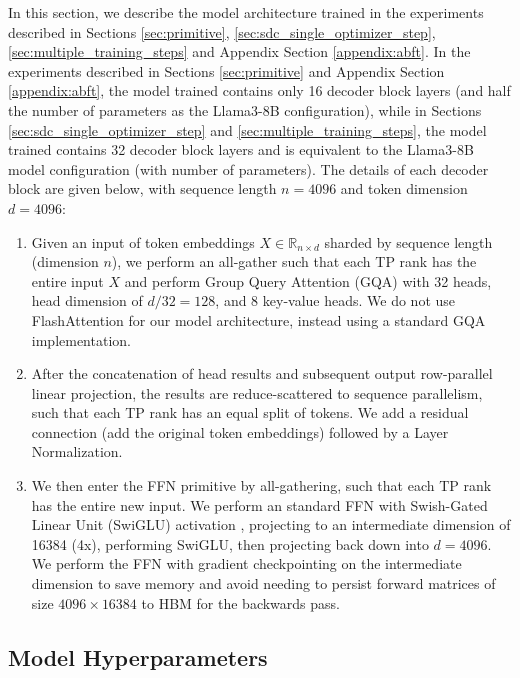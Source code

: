 In this section, we describe the model architecture trained in the experiments described in Sections \ref{sec:primitive}, \ref{sec:sdc_single_optimizer_step}, \ref{sec:multiple_training_steps} and Appendix Section \ref{appendix:abft}. In the experiments described in Sections \ref{sec:primitive} and Appendix Section \ref{appendix:abft}, the model trained contains only 16 decoder block layers (and half the number of parameters as the Llama3-8B configuration), while in Sections \ref{sec:sdc_single_optimizer_step} and \ref{sec:multiple_training_steps}, the model trained contains 32 decoder block layers and is equivalent to the Llama3-8B model configuration (with number of parameters). The details of each decoder block are given below, with sequence length $n=4096$ and token dimension $d=4096$:
\begin{enumerate}
    \item Given an input of token embeddings $X \in \mathbb{R}_{n \times d}$ sharded by sequence length (dimension $n$), we perform an all-gather such that each TP rank has the entire input $X$ and perform Group Query Attention (GQA)  \cite{ainslie2023gqatraininggeneralizedmultiquery} with 32 heads, head dimension of $d / 32 = 128$, and 8 key-value heads.
    We do not use FlashAttention \cite{dao2022flashattentionfastmemoryefficientexact} for our model architecture, instead using a standard GQA implementation.
    \item After the concatenation of head results and subsequent output row-parallel linear projection, the results are reduce-scattered to sequence parallelism, such that each TP rank has an equal split of tokens. We add a residual connection (add the original token embeddings) followed by a Layer Normalization.
    \item We then enter the FFN primitive by all-gathering, such that each TP rank has the entire new input. We perform an standard FFN with Swish-Gated Linear Unit (SwiGLU) activation \cite{shazeer2020gluvariantsimprovetransformer}, projecting to an intermediate dimension of 16384 (4x), performing SwiGLU, then projecting back down into $d=4096$. We perform the FFN with gradient checkpointing \cite{chen2016trainingdeepnetssublinear} on the intermediate dimension to save memory and avoid needing to persist forward matrices of size $4096 \times 16384$ to HBM for the backwards pass.
\end{enumerate}

\subsection{Model Hyperparameters}

